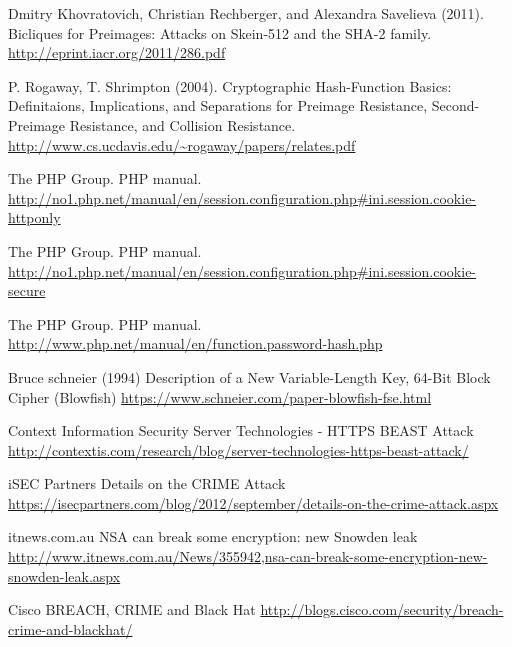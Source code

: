 \documentclass[11pt, a4paper]{article}
\begin{document}
\begin{thebibliography}{9}

    Dmitry Khovratovich, Christian Rechberger, and Alexandra Savelieva (2011).
    Bicliques for Preimages: Attacks on Skein-512 and the SHA-2 family.
    \url{http://eprint.iacr.org/2011/286.pdf}

    P. Rogaway, T. Shrimpton (2004).
    Cryptographic Hash-Function Basics: Definitaions, Implications, and Separations for Preimage Resistance, Second-Preimage Resistance, and Collision Resistance.
    \url{http://www.cs.ucdavis.edu/~rogaway/papers/relates.pdf}

    The PHP Group.
    PHP manual.
    \url{http://no1.php.net/manual/en/session.configuration.php#ini.session.cookie-httponly}
    
    The PHP Group.
    PHP manual.
    \url{http://no1.php.net/manual/en/session.configuration.php#ini.session.cookie-secure}

    The PHP Group.
    PHP manual.
    \url{http://www.php.net/manual/en/function.password-hash.php}

    Bruce schneier (1994)
    Description of a New Variable-Length Key, 64-Bit Block Cipher (Blowfish)
    \url{https://www.schneier.com/paper-blowfish-fse.html}

    Context Information Security
    Server Technologies - HTTPS BEAST Attack
    \url{http://contextis.com/research/blog/server-technologies-https-beast-attack/}

    iSEC Partners
    Details on the CRIME Attack
    \url{https://isecpartners.com/blog/2012/september/details-on-the-crime-attack.aspx}

    itnews.com.au
    NSA can break some encryption: new Snowden leak
    \url{http://www.itnews.com.au/News/355942,nsa-can-break-some-encryption-new-snowden-leak.aspx}

    Cisco
    BREACH, CRIME and Black Hat
    \url{http://blogs.cisco.com/security/breach-crime-and-blackhat/}

\end{thebibliography}
\end{document}
